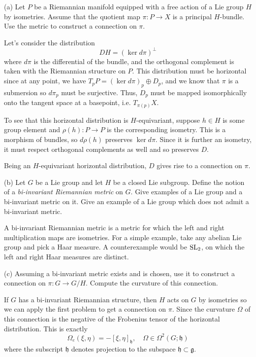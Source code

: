 \documentclass{../../templates/lkx_pset}
\begin{document}
\begin{problem}{6}
\end{problem}
\begin{parts}
	\begin{part}{(a)}
		Let $P$ be a Riemannian manifold equipped with a free action of a Lie group $H$ by isometries. Assume that the quotient map $\pi : P \to X$ is a principal $H$-bundle. Use the metric to construct a connection on $\pi$.
	\end{part}

	Let's consider the distribution
	\[
		DH = (\ker d\pi)^\perp
	\]
	where $d\pi$ is the differential of the bundle, and the orthogonal complement is taken with the Riemannian structure on $P$. This distribution must be horizontal since at any point, we have $T_p P = (\ker d\pi)_p\oplus D_p$, and we know that $\pi$ is a submersion so $d\pi_p$ must be surjective. Thus, $D_p$ must be mapped isomorphically onto the tangent space at a basepoint, i.e. $T_{\pi(p)} X$.

	To see that this horizontal distribution is $H$-equivariant, suppose $h\in H$ is some group element and $\rho(h) : P \to P$ is the corresponding isometry. This is a morphism of bundles, so $d\rho(h)$ preserves $\ker d\pi$. Since it is further an isometry, it must respect orthogonal complements as well and so preserves $D$.

	Being an $H$-equivariant horizontal distribution, $D$ gives rise to a connection on $\pi$.

	\begin{part}{(b)}
		Let $G$ be a Lie group and let $H$ be a closed Lie subgroup. Define the notion of a \emph{bi-invariant Riemannian metric} on $G$. Give examples of a Lie group and a bi-invariant metric on it. Give an example of a Lie group which does not admit a bi-invariant metric.
	\end{part}

	A bi-invariant Riemannian metric is a metric for which the left and right multiplication maps are isometries. For a simple example, take any abelian Lie group and pick a Haar measure. A counterexample would be $\textrm{SL}_2$, on which the left and right Haar measures are distinct.

	\begin{part}{(c)}
		Assuming a bi-invariant metric exists and is chosen, use it to construct a connection on $\pi : G \to G/H$. Compute the curvature of this connection.
	\end{part}

  If $G$ has a bi-invariant Riemannian structure, then $H$ acts on $G$ by isometries so we can apply the first problem to get a connection on $\pi$. Since the curvature $\Omega$ of this connection is the negative of the Frobenius tensor of the horizontal distribution. This is exactly
  \[
    \Omega_e(\xi, \eta) = -[\xi, \eta]_{\mathfrak{h}}, \quad \Omega\in \Omega^2(G; \mathfrak{h})
  \]
  where the subscript $\mathfrak{h}$ denotes projection to the subspace $\mathfrak{h}\subset \mathfrak{g}$.


\end{parts}
\end{document}

